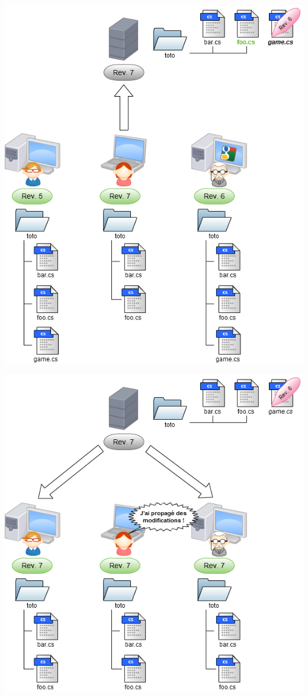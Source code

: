 \begin{frame}
  \begin{center}
    \includegraphics[scale=0.3]{images/10-Commit4.png}
  \end{center}
\end{frame}

\begin{frame}
  \begin{center}
    \includegraphics[scale=0.3]{images/11-Update.png}
  \end{center}
\end{frame}

